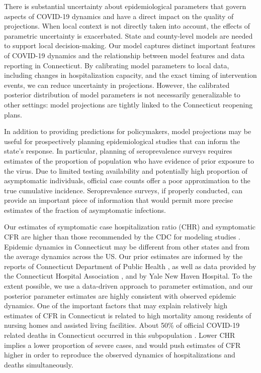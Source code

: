 \documentclass[11pt]{article}
\begin{document}
There is substantial uncertainty about epidemiological parameters that govern aspects of COVID-19 dynamics and have a direct impact on the quality of projections. When local context is not directly taken into account, the effects of parametric uncertainty is exacerbated.  State and county-level models are needed to support local decision-making.  Our model captures distinct important features of COVID-19 dynamics and the relationship between model features and data reporting in Connecticut.  By calibrating model parameters to local data, including changes in hospitalization capacity, and the exact timing of intervention events, we can reduce uncertainty in projections. However, the calibrated posterior distribution of model parameters is not necessarily generalizable to other settings: model projections are tightly linked to the Connecticut reopening plans. 

In addition to providing predictions for policymakers, model projections may be useful for prospectively planning epidemiological studies that can inform the state's response.  In particular, planning of seroprevalence surveys requires estimates of the proportion of population who have evidence of prior exposure to the virus. Due to limited testing availability and potentially high proportion of asymptomatic individuals, official case counts offer a poor approximation to the true cumulative incidence. Seroprevalence surveys, if properly conducted, can provide an important piece of information that would permit more precise estimates of the fraction of asymptomatic infections. 

Our estimates of symptomatic case hospitalization ratio (CHR) and symptomatic CFR are higher than those recommended by the CDC for modeling studies \citep{cdc2020scenarios}. 
Epidemic dynamics in Connecticut may be different from other states and from the average dynamics across the US. Our prior estimates are informed by the reports of Connecticut Department of Public Health \citep{DPHwebsite, DPHwebsitenursing}, as well as data provided by the Connecticut Hospital Association \citep{CHAwebsite}, and by Yale New Haven Hospital. To the extent possible, we use a data-driven approach to parameter estimation, and our posterior parameter estimates are highly consistent with observed epidemic dynamics. One of the important factors that may explain relatively high estimates of CFR in Connecticut is related to high mortality among residents of nursing homes and assisted living facilities. About 50\% of official COVID-19 related deaths in Connecticut occurred in this subpopulation \citep{DPHwebsitenursing}. 
Lower CHR implies a lower proportion of severe cases, and would push estimates of CFR higher in order to reproduce the observed dynamics of hospitalizations and deaths simultaneously.  
\end{document}
